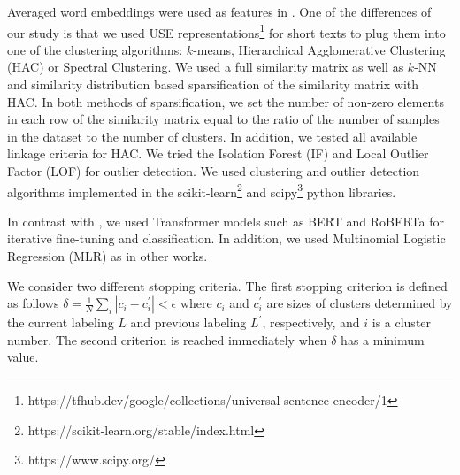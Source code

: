 \documentclass[11pt,a4paper]{article}
\begin{document}
Averaged word embeddings were used as features in \cite{rakib2020enhancement,xu2017self}. One of the differences of our study is that we used USE representations\footnote{https://tfhub.dev/google/collections/universal-sentence-encoder/1} \cite{DBLP:journals/corr/abs-1803-11175,DBLP:journals/corr/abs-1907-04307} for short texts to plug them into one of the clustering algorithms: $k$-means, Hierarchical Agglomerative Clustering (HAC) or Spectral Clustering. We used a full similarity matrix as well as $k$-NN and similarity distribution based sparsification of the similarity matrix  \cite{rakib2018improving} with HAC. In both methods of sparsification, we set the number of non-zero elements in each row of the similarity matrix equal to the ratio of the number of samples in the dataset to the number of clusters. In addition, we tested all available linkage criteria for HAC. We tried the Isolation Forest (IF) \cite{liu2008isolation} and Local Outlier Factor (LOF) \cite{breunig2000lof} for outlier detection. We used clustering and outlier detection algorithms implemented in the scikit-learn\footnote{https://scikit-learn.org/stable/index.html} and scipy\footnote{https://www.scipy.org/} python libraries.

In contrast with \cite{rakib2020enhancement}, we used Transformer models such as BERT \cite{devlin2018bert} and RoBERTa \cite{liu2019roberta} for iterative fine-tuning and classification. In addition, we used Multinomial Logistic Regression (MLR) as in other works.

We consider two different stopping criteria. The first stopping criterion \cite{rakib2020enhancement} is defined as follows $\delta=\frac{1}{N}\sum_i|c_i-c^\prime_i|<\epsilon$ where $c_i$ and $c_i^\prime$ are sizes of clusters determined by the current labeling $L$ and previous labeling $L^\prime$, respectively, and $i$ is a cluster number. The second criterion is reached immediately when $\delta$ has a minimum value.
\end{document}
